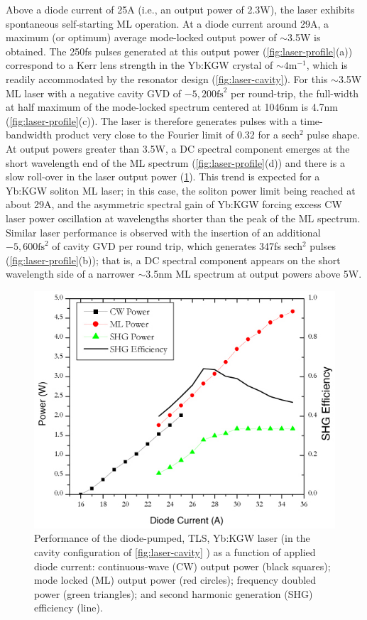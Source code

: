 Above a diode current of 25A (i.e., an output power of 2.3W), the laser exhibits spontaneous self-starting ML operation.
At a diode current around 29A, a maximum (or optimum) average mode-locked output power of $\sim$3.5W is obtained.
The 250fs pulses generated at this output power (\ref{fig:laser-profile}(a)) correspond to a Kerr lens strength in the Yb:KGW crystal of $\sim4 \text{m}^{-1}$, which is readily accommodated by the resonator design (\ref{fig:laser-cavity}).
For this $\sim$3.5W ML laser with a negative cavity GVD of $-5,200\text{fs}^2$ per round-trip, the full-width at
half maximum of the mode-locked spectrum centered at 1046nm is 4.7nm (\ref{fig:laser-profile}(c)).
The laser is therefore generates pulses with a time-bandwidth product very close to the Fourier limit of 0.32 for a sech$^2$ pulse shape.
At output powers greater than 3.5W, a DC spectral component emerges at the short wavelength end of the ML spectrum (\ref{fig:laser-profile}(d)) and there is a slow roll-over in the laser output power (\ref{fig:laser-performance}).
This trend is expected for a Yb:KGW soliton ML laser; in this case, the soliton power limit being reached at about 29A, and the asymmetric spectral gain of Yb:KGW forcing excess CW laser power oscillation at wavelengths shorter than the peak of the ML spectrum.
Similar laser performance is observed with the insertion of an additional $-5,600\text{fs}^2$ of cavity GVD per round trip, which generates 347fs sech$^2$ pulses (\ref{fig:laser-profile}(b)); that is, a DC spectral component appears on the short wavelength side of a narrower $\sim$3.5nm ML spectrum at output powers above 5W.

\begin{figure}
  \centering
  \includegraphics{performance.jpg}
  \caption{
Performance of the diode-pumped, TLS, Yb:KGW laser (in the cavity configuration of \protect\ref{fig:laser-cavity}\protect{} ) as a function of applied diode current: continuous-wave (CW) output power (black squares); mode locked (ML) output power (red circles); frequency doubled power (green triangles); and second harmonic generation (SHG) efficiency (line).
  }
  \label{fig:laser-performance}
\end{figure}

